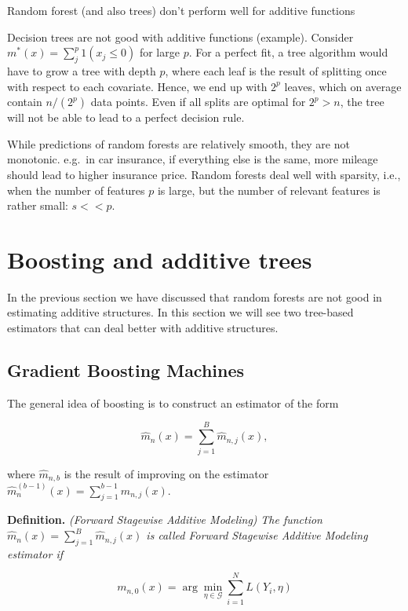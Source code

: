 \documentclass[
]{book}
\begin{document}
Random forest (and also trees) don't perform well for additive functions

Decision trees are not good with additive functions (example). Consider \(m^\ast(x) = \sum_j^p 1(x_j \leq 0)\) for large \(p\). For a perfect fit, a tree algorithm would have to grow a tree with depth \(p\),
where each leaf is the result of splitting once with respect to each covariate. Hence, we end up with \(2^p\) leaves, which on average contain \(n/(2^p)\) data points. Even if all splits are optimal for \(2^p>n\), the tree will not be able to lead to a perfect decision rule.

While predictions of random forests are relatively smooth, they are not monotonic. e.g.~in car insurance, if everything else is the same, more mileage should lead to higher insurance price. Random forests deal well with sparsity, i.e., when the number of features \(p\) is large, but the number of relevant features is rather small: \(s<<p\).

\hypertarget{boosting-and-additive-trees}{%
\section{Boosting and additive trees}\label{boosting-and-additive-trees}}

In the previous section we have discussed that random forests are not good in estimating additive structures. In this section we will see two tree-based estimators that can deal better with additive structures.

\hypertarget{gradient-boosting-machines}{%
\subsection{Gradient Boosting Machines}\label{gradient-boosting-machines}}

The general idea of boosting is to construct an estimator of the form

\[
\hat m_n(x)=\sum_{j=1}^B \hat m_{n,j}(x),
\]

where \(\hat m_{n,b}\) is the result of improving on the estimator \(\hat m_n^{(b-1)}(x)=\sum_{j=1}^{b-1} \hat m_{n,j}(x)\).

\textbf{Definition.} \emph{(Forward Stagewise Additive Modeling)} \emph{The function \(\hat m_n(x)=\sum_{j=1}^B \hat m_{n,j}(x)\) is called Forward Stagewise Additive Modeling estimator if}

\[
m_{n,0}(x)=\arg \min_{\eta\in \mathcal G} \sum_{i=1}^N L\left(Y_i, \eta\right)
\]
\end{document}
